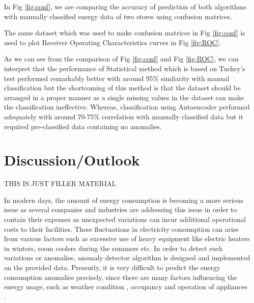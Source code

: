 \documentclass[conference]{IEEEtran}
\begin{document}
In Fig \ref{fig:conf}, we are comparing the accuracy of prediction of both algorithms with manually classified energy data of two stores using confusion matrices. 


The same dataset which was used to make confusion matrices in Fig \ref{fig:conf} is used to plot Receiver Operating Characteristics curves in Fig \ref{fig:ROC}.




As we can see from the comparison of Fig \ref{fig:conf} and Fig \ref{fig:ROC}, we can interpret that the performance of Statistical method which is based on Tuckey's test performed remarkably better with around 95\% similarity with manual classification but the shortcoming of this method is that the dataset should be arranged in a proper manner as a single missing values in the dataset can make the classification ineffective. Whereas, classification using Autoencoder performed adequately with around 70-75\% correlation with manually classified data but it required pre-classified data containing no anomalies.  
 
 \section{Discussion/Outlook}
 
 THIS IS JUST FILLER MATERIAL 
 
 In modern days, the amount of energy consumption is becoming a more serious issue as several companies and industries are addressing this issue in order to contain their expenses as unexpected variations can incur additional operational costs to their facilities. These fluctuations in electricity consumption can arise from various factors such as excessive use of heavy equipment like electric heaters in winters, room coolers during the summers etc. In order to detect such variations or anomalies, anomaly detector algorithm is designed and implemented on the provided data.
 Presently, it is very difficult to predict the energy consumption anomalies precisely, since there are many factors influencing the energy usage, such as weather condition \cite{bb0},  occupancy \cite{bb1} and operation of appliances \cite{bb2,bb3}.
\end{document}
